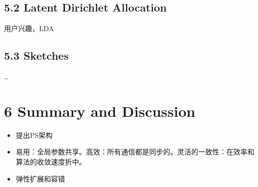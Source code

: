 \documentclass[11pt]{article}
\begin{document}
\subsection{5.2 Latent Dirichlet Allocation}
\label{sec:org5564120}
用户兴趣，LDA
\subsection{5.3 Sketches}
\label{sec:org7208d66}
\ldots{}
\section{6 Summary and Discussion}
\label{sec:org4eeb96d}
\begin{itemize}
\item 提出PS架构
\item 易用：全局参数共享。高效：所有通信都是同步的。灵活的一致性：在效率和算法的收敛速度折中。
\item 弹性扩展和容错
\end{itemize}
\end{document}
